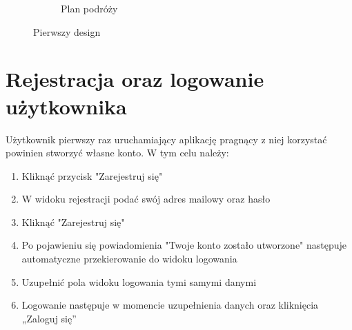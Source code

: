 \documentclass[10pt,twoside,a4paper]{report}
\begin{document}
\begin{figure}[h]
\begin{subfigure}{0.3\textwidth}
\caption{Plan podróży}
\label{fig:firstDesign3}
\end{subfigure}
\caption{Pierwszy design}
\label{fig:podrecznik10}
\end{figure}

\section{Rejestracja oraz logowanie użytkownika}
Użytkownik pierwszy raz uruchamiający aplikację pragnący z niej korzystać powinien stworzyć własne konto. W tym celu należy:

\begin{enumerate}

\item Kliknąć przycisk "Zarejestruj się"
\item W widoku rejestracji podać swój adres mailowy oraz hasło
\item Kliknąć "Zarejestruj się"
\item Po pojawieniu się powiadomienia "Twoje konto zostało utworzone" następuje automatyczne przekierowanie do widoku logowania
\item Uzupełnić pola widoku logowania tymi samymi danymi 
\item Logowanie następuje w momencie uzupełnienia danych oraz kliknięcia „Zaloguj się”

\end{enumerate}
\end{document}
